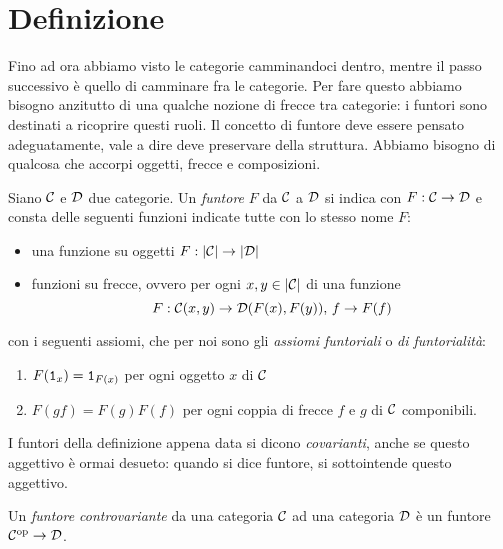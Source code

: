 
\section{Definizione}

Fino ad ora abbiamo visto le categorie camminandoci dentro, mentre il passo successivo è quello di camminare fra le categorie. Per fare questo abbiamo bisogno anzitutto di una qualche nozione di frecce tra categorie: i funtori sono destinati a ricoprire questi ruoli. Il concetto di funtore deve essere pensato adeguatamente, vale a dire deve preservare della struttura. Abbiamo bisogno di qualcosa che accorpi oggetti, frecce e composizioni.

\begin{definizione}[Funtori]\label{definizione:DefFunc}
Siano \(\mathcal C\) e \(\mathcal D\) due categorie. Un {\em funtore} \(F\) da \(\mathcal C\) a \(\mathcal D\) si indica con \(F : \mathcal C \to \mathcal D\) e consta delle seguenti funzioni indicate tutte con lo stesso nome \(F\):
\begin{itemize}
\item una funzione su oggetti \(F : \lvert\mathcal C\rvert \to \lvert\mathcal D\rvert\)
\item funzioni su frecce, ovvero per ogni \(x,y \in \lvert\mathcal C\rvert\) di una funzione
\[F : \mathcal C(x, y) \to \mathcal D(F(x), F(y)),\, f \to F(f)\] 
\end{itemize}
con i seguenti assiomi, che per noi sono gli {\em assiomi funtoriali} o {\em di funtorialità}:
\begin{enumerate}
\item \(F(\mathtt{1}_x) = \mathtt{1}_{F(x)}\) per ogni oggetto \(x\) di \(\mathcal C\)
\item \(F(gf) = F(g)F(f)\) per ogni coppia di frecce \(f\) e \(g\) di \(\mathcal C\) componibili.
\end{enumerate}
\end{definizione}

I funtori della definizione appena data si dicono {\em covarianti}, anche se questo aggettivo è ormai desueto: quando si dice funtore, si sottointende questo aggettivo.

\begin{definizione}\label{definizione:ContrFunc}
Un {\em funtore controvariante} da una categoria \(\mathcal C\) ad una categoria \(\mathcal D\) è un funtore \(\mathcal C^\text{op} \to \mathcal D\).
\end{definizione}

